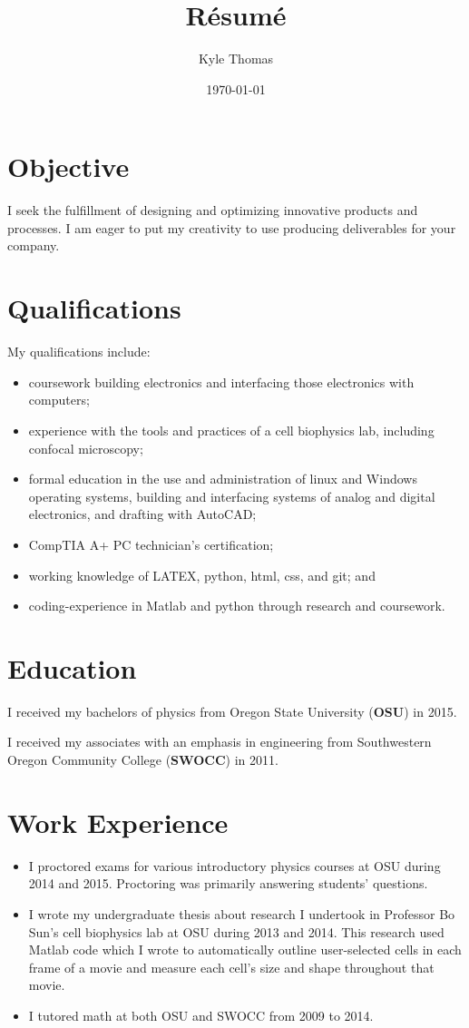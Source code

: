 \documentclass[ notitlepage, prl]{ revtex4-1}
\begin{document}
\author{Kyle Thomas}
\title{R\'esum\'e}
\date{\today}
\maketitle

\section*{Objective}
\par I seek the fulfillment of designing and optimizing innovative products and processes. I am eager to put my creativity to use producing deliverables for your company.

\section*{Qualifications}
My qualifications include:
\begin{itemize}
\item coursework building electronics and interfacing those electronics with computers;
\item experience with the tools and practices of a cell biophysics lab, including confocal microscopy;
\item formal education in the use and administration of linux and Windows operating systems, building and interfacing systems of analog and digital electronics, and drafting with AutoCAD;
\item CompTIA A+ PC technician's certification;
\item working knowledge of LATEX, python, html, css, and git; and
\item coding-experience in Matlab and python through research and coursework.
\end{itemize}

\section*{Education}
\par I received my bachelors of physics from Oregon State University (\textbf {OSU}) in 2015.
\par I received my associates with an emphasis in engineering from Southwestern Oregon Community College (\textbf {SWOCC}) in 2011.

\section*{Work Experience}
\begin{itemize}
\item I proctored exams for various introductory physics courses at OSU during 2014 and 2015. Proctoring was primarily answering students' questions.
\item I wrote my undergraduate thesis about research I undertook in Professor Bo Sun's cell biophysics lab at OSU during 2013 and 2014. 
This research used Matlab code which I wrote to automatically outline user-selected cells in each frame of a movie and measure each cell's size and shape throughout that movie.
\item I tutored math at both OSU and SWOCC from 2009 to 2014.
\end{itemize}
\end{document}
